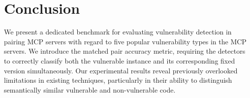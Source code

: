 \section{Conclusion}

We present a dedicated benchmark for evaluating vulnerability detection in pairing MCP servers with regard to five popular vulnerability types in the MCP servers. %
We introduce the matched pair accuracy metric, requiring the detectors to correctly classify both the vulnerable instance and its corresponding fixed version simultaneously. Our experimental results reveal previously overlooked limitations in existing techniques, particularly in their ability to distinguish semantically similar vulnerable and non-vulnerable code. %